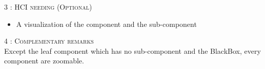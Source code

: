 \begin{flushleft}
    \BlackLine
    \textsc{\Large 3 : HCI needing (Optional)}\\[0.3cm]
    \begin{itemize}
        \item A visualization of the component and the sub-component
    \end{itemize}

    \BlackLine
    \textsc{\Large 4 : Complementary remarks}\\[0.3cm]

    Except the leaf component which has no sub-component and the BlackBox, every component are zoomable.

\end{flushleft}
